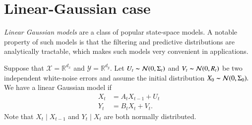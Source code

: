 \documentclass[
]{book}
\theoremstyle{break}
\theoremstyle{nonumberplain}
\begin{document}
\chapter{Linear-Gaussian case}

\textit{Linear Gaussian models} are a class of popular state-space
models. A notable property of such models is that the filtering and
predictive distributions are analytically tractable, which makes such
models very convenient in applications.

Suppose that \(\mathcal X=\mathbb R^{d_x}\) and
\(\mathcal Y=\mathbb R^{d_y}.\) Let
\(U_t\thicksim\mathcal N(0,\Sigma_t)\) and
\(V_t\thicksim\mathcal N(0,R_t)\) be two independent white-noise errors
and assume the initial distribution
\(X_0\thicksim\mathcal N(0,\Sigma_0).\) We have a linear Gaussian model
if \begin{align}
X_t &= A_tX_{t-1}+U_t \\
Y_t &= B_tX_t + V_t.
\end{align} Note that \(X_t\mid X_{t-1}\) and \(Y_t\mid X_t\) are both
normally distributed.\\
\end{document}
